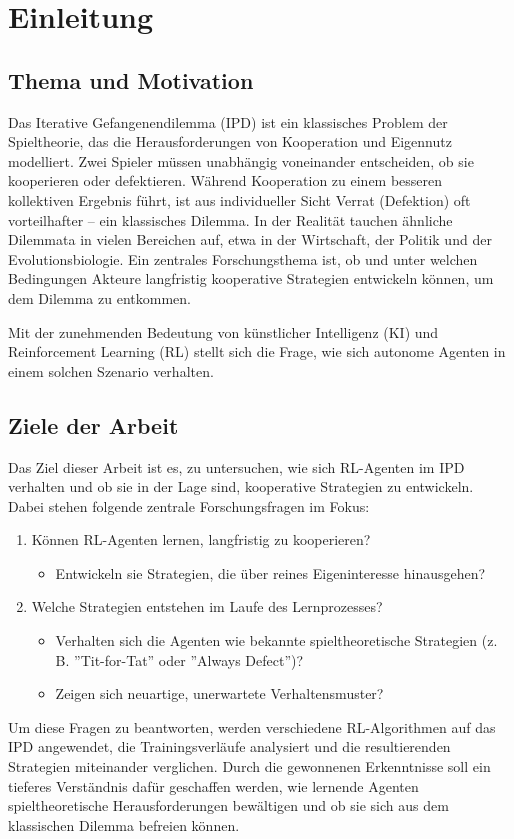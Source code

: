 \chapter{Einleitung}

\section{Thema und Motivation}
Das Iterative Gefangenendilemma (IPD) ist ein klassisches Problem der Spieltheorie, 
das die Herausforderungen von Kooperation und Eigennutz modelliert. 
Zwei Spieler müssen unabhängig voneinander entscheiden, ob sie kooperieren oder 
defektieren. Während Kooperation zu einem besseren kollektiven Ergebnis führt, 
ist aus individueller Sicht Verrat (Defektion) oft vorteilhafter -- ein klassisches Dilemma.
In der Realität tauchen ähnliche Dilemmata in vielen Bereichen auf, etwa in der 
Wirtschaft, der Politik und der Evolutionsbiologie. Ein zentrales Forschungsthema 
ist, ob und unter welchen Bedingungen Akteure langfristig kooperative Strategien 
entwickeln können, um dem Dilemma zu entkommen.

Mit der zunehmenden Bedeutung von künstlicher Intelligenz (KI) und Reinforcement 
Learning (RL) stellt sich die Frage, wie sich autonome Agenten in einem solchen 
Szenario verhalten. 

\section{Ziele der Arbeit}
Das Ziel dieser Arbeit ist es, zu untersuchen, wie sich RL-Agenten im IPD verhalten
und ob sie in der Lage sind, kooperative Strategien zu entwickeln. Dabei stehen 
folgende zentrale Forschungsfragen im Fokus:
\begin{enumerate}
    \item Können RL-Agenten lernen, langfristig zu kooperieren?
        \begin{itemize}
            \item Entwickeln sie Strategien, die über reines Eigeninteresse hinausgehen?
        \end{itemize}
    \item Welche Strategien entstehen im Laufe des Lernprozesses?
        \begin{itemize}
            \item Verhalten sich die Agenten wie bekannte spieltheoretische Strategien (z. B. ''Tit-for-Tat'' oder ''Always Defect'')?
            \item Zeigen sich neuartige, unerwartete Verhaltensmuster?
        \end{itemize}

\end{enumerate}
Um diese Fragen zu beantworten, werden verschiedene RL-Algorithmen auf das IPD 
angewendet, die Trainingsverläufe analysiert und die resultierenden Strategien 
miteinander verglichen. Durch die gewonnenen Erkenntnisse soll ein tieferes Verständnis 
dafür geschaffen werden, wie lernende Agenten spieltheoretische Herausforderungen 
bewältigen und ob sie sich aus dem klassischen Dilemma befreien können.

